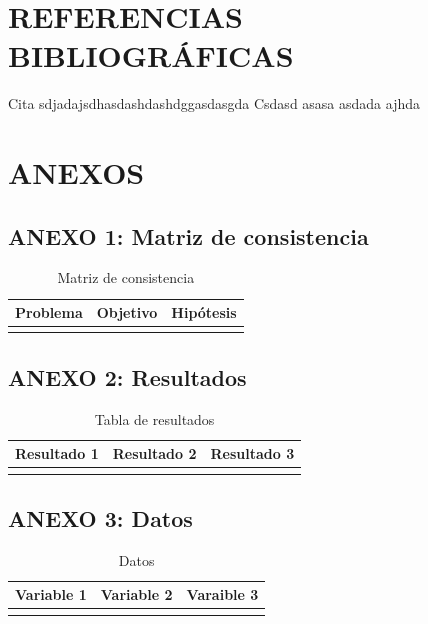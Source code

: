 \documentclass[12pt,a4paper]{article} %
\begin{document}
		\lipsum[1]

\newpage
\section{\hspace{2.5mm} REFERENCIAS BIBLIOGRÁFICAS}
    	
        	\begin{thebibliography}{4}
            	 Cita sdjadajsdhasdashdashdggasdasgda
							 Csdasd
							 asasa
							 asdada
							 ajhda
        	\end{thebibliography}



\newpage
\section{\hspace{0.5mm} ANEXOS}
    \subsection{ANEXO 1: Matriz de consistencia}
			\begin{table}[H]
				\centering
				\caption{Matriz de consistencia}
					\begin{tabular}{p{5cm}p{5cm}p{5cm}}
						\hline
						Problema & Objetivo & Hipótesis\\
						\hline
						\lipsum[1] & \lipsum[1] & \lipsum[1]\\
						\hline
					\end{tabular}
				\label{tab: Matriz de consistencia}
			\end{table}

    \subsection{ANEXO 2: Resultados }
			\begin{table}[H]
				\centering
				\caption{Tabla de resultados}
					\begin{tabular}{p{5cm}p{5cm}p{5cm}}
						\hline
						Resultado 1 & Resultado 2 & Resultado 3\\
						\hline
						\lipsum[1] & \lipsum[1] & \lipsum[1]\\
						\hline
					\end{tabular}
				\label{tab: Resultados}
			\end{table}

	    \subsection{ANEXO 3: Datos }
				\begin{table}[H]
					\centering
					\caption{Datos}
						\begin{tabular}{p{5cm}p{5cm}p{5cm}}
							\hline
							Variable 1 & Variable 2 & Varaible 3\\
							\hline
							\lipsum[1] & \lipsum[1] & \lipsum[1]\\
							\hline
						\end{tabular}
					\label{tab: Datos}
				\end{table}
\end{document}
